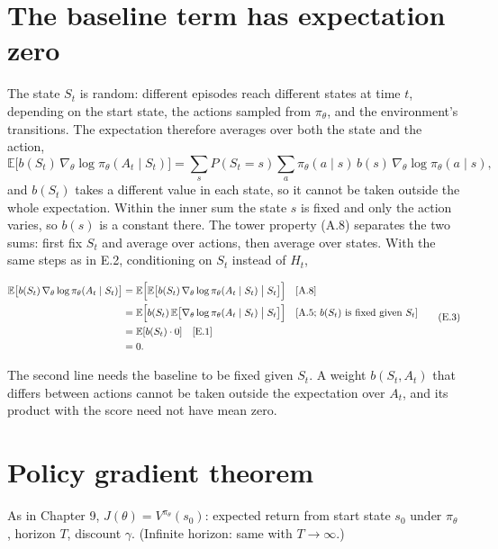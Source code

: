 \section{The baseline term has expectation zero}

The state $S_t$ is random: different episodes reach different states at time $t$, depending on the start state, the actions sampled from $\pi_\theta$, and the environment's transitions. The expectation therefore averages over both the state and the action, \[
\mathbb{E}\bigl[b(S_t)\,\nabla_\theta\log\pi_\theta(A_t\mid S_t)\bigr]
=
\sum_{s}P(S_t=s)\sum_{a}\pi_\theta(a\mid s)\,b(s)\,\nabla_\theta\log\pi_\theta(a\mid s),
\] and $b(S_t)$ takes a different value in each state, so it cannot be taken outside the whole expectation. Within the inner sum the state $s$ is fixed and only the action varies, so $b(s)$ is a constant there. The tower property (A.8) separates the two sums: first fix $S_t$ and average over actions, then average over states. With the same steps as in E.2, conditioning on $S_t$ instead of $H_t$,

\begin{equation}
\begin{aligned}
\mathbb{E}\bigl[b(S_t)\,\nabla_\theta\log\pi_\theta(A_t\mid S_t)\bigr]
&=
\mathbb{E}\Bigl[\mathbb{E}\bigl[b(S_t)\,\nabla_\theta\log\pi_\theta(A_t\mid S_t)\bigm|S_t\bigr]\Bigr]
\quad\text{[A.8]}
\\
&=
\mathbb{E}\Bigl[b(S_t)\,\mathbb{E}\bigl[\nabla_\theta\log\pi_\theta(A_t\mid S_t)\bigm|S_t\bigr]\Bigr]
\quad\text{[A.5; $b(S_t)$ is fixed given $S_t$]}
\\
&=
\mathbb{E}[b(S_t)\cdot 0]
\quad\text{[E.1]}
\\
&=
0.
\end{aligned}
\tag{E.3}\label{eq:E.3}
\end{equation}

The second line needs the baseline to be fixed given $S_t$. A weight $b(S_t,A_t)$ that differs between actions cannot be taken outside the expectation over $A_t$, and its product with the score need not have mean zero.

\section{Policy gradient theorem}

As in Chapter 9, $J(\theta)=V^{\pi_\theta}(s_0)$: expected return from start state $s_0$ under $\pi_\theta$, horizon $T$, discount $\gamma$. (Infinite horizon: same with $T\to\infty$.)

